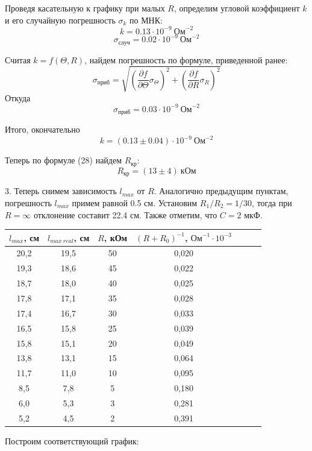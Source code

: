 \documentclass[14pt]{article}
\begin{document}
\vspace{1cm}
Проведя касательную к графику при малых $R$, определим угловой коэффициент $k$ и его случайную погрешность $\sigma_k$ по МНК:
$$
	k = 0.13 \cdot 10^{-9}~\text{Ом}^{-2}
$$
$$
	\sigma_{\text{случ}} = 0.02 \cdot 10^{-9}~\text{Ом}^{-2}
$$

Считая $k = f(\Theta, R)$, найдем погрешность по формуле, приведенной ранее:
$$
	\sigma_{\text{приб}} = \sqrt{\left(\frac{\partial f}{\partial \Theta}\sigma_\Theta\right)^2 + \left(\frac{\partial f}{\partial R}\sigma_R\right)^2}
$$
Откуда
$$
	\sigma_{\text{приб}} = 0.03 \cdot 10^{-9}~\text{Ом}^{-2}
$$

Итого, окончательно
$$
	k = (0.13 \pm 0.04) \cdot 10^{-9}~\text{Ом}^{-2}
$$

\vspace{1cm}
Теперь по формуле (28) найдем $R_\text{кр}$:
$$
	R_\text{кр} = (13 \pm 4)~\text{кОм}
$$

\vspace{1cm}
3. Теперь снимем зависимость $l_{max}$ от $R$. Аналогично предыдущим пунктам, погрешность $l_{max}$ примем равной 0.5 см. Установим $R_1/R_2 = 1/30$, тогда при $R = \infty$ отклонение составит 22.4 см. Также отметим, что $C = 2$ мкФ.

\begin{center}
\begin{tabular}{|c|c|c|c|c|c|c|}
\hline
$l_{max}$, см&$l_{max~real}$, см&$R$, кОм&$(R+R_0)^{-1}$, $\text{Ом}^{-1}\cdot10^{-3}$\\
\hline
20,2&19,5&50&0,020\\
\hline
19,3&18,6&45&0,022\\
\hline
18,7&18,0&40&0,025\\
\hline
17,8&17,1&35&0,028\\
\hline
17,4&16,7&30&0,033\\
\hline
16,5&15,8&25&0,039\\
\hline
15,8&15,1&20&0,049\\
\hline
13,8&13,1&15&0,064\\
\hline
11,7&11,0&10&0,095\\
\hline
8,5&7,8&5&0,180\\
\hline
6,0&5,3&3&0,281\\
\hline
5,2&4,5&2&0,391\\
\hline
\end{tabular}
\end{center}

Построим соответствующий график:
\end{document}
